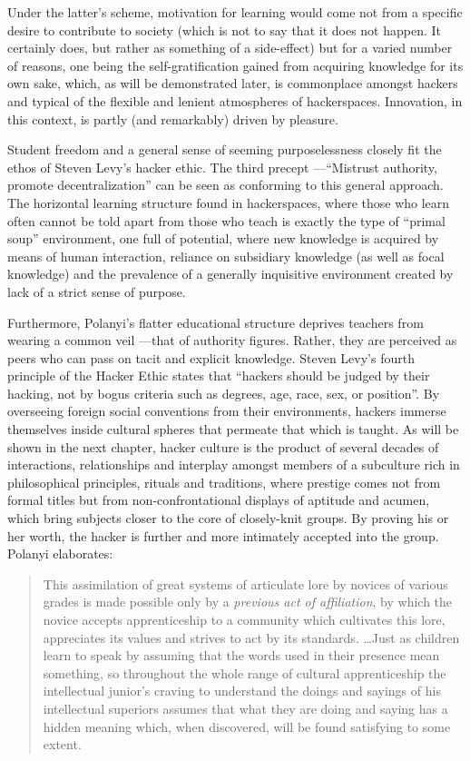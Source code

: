 Under the latter's scheme, motivation for learning would come not from a specific desire to contribute to society (which is not to say that it does not happen. It certainly does, but rather as something of a side-effect) but for a varied number of reasons, one being the self-gratification gained from acquiring knowledge for its own sake, which, as will be demonstrated later, is commonplace amongst hackers and typical of the flexible and lenient atmospheres of hackerspaces. Innovation, in this context, is partly (and remarkably) driven by pleasure. 

Student freedom and a general sense of seeming purposelessness closely fit the ethos of Steven Levy's hacker ethic. The third precept ---``Mistrust authority, promote decentralization'' can be seen as conforming to this general approach. The horizontal learning structure found in hackerspaces, where those who learn often cannot be told apart from those who teach is exactly the type of ``primal soup'' environment, one full of potential, where new knowledge is acquired by means of human interaction, reliance on subsidiary knowledge (as well as focal knowledge) and the prevalence of a generally inquisitive environment created by lack of a strict sense of purpose.



Furthermore, Polanyi's flatter educational structure deprives teachers from wearing a common veil ---that of authority figures. Rather, they are perceived as peers who can pass on tacit and explicit knowledge. Steven Levy's fourth principle of the Hacker Ethic states that ``hackers should be judged by their hacking, not by bogus criteria such as degrees, age, race, sex, or position''. By overseeing foreign social conventions from their environments, hackers immerse themselves inside cultural spheres that permeate that which is taught. As will be shown in the next chapter, hacker culture is the product of several decades of interactions, relationships and interplay amongst members of a subculture rich in philosophical principles, rituals and traditions, where prestige comes not from formal titles but from non-confrontational displays of aptitude and acumen, which bring subjects closer to the core of closely-knit groups. By proving his or her worth, the hacker is further and more intimately accepted into the group. Polanyi elaborates:

\begin{quote}
This assimilation of great systems of articulate lore by novices of various grades is made possible only by a \emph{previous act of affiliation}, by which the novice accepts apprenticeship to a community which cultivates this lore, appreciates its values and strives to act by its standards. \ldots Just as children learn to speak by assuming that the words used in their presence mean something, so throughout the whole range of cultural apprenticeship the intellectual junior's craving to understand the doings and sayings of his intellectual superiors assumes that what they are doing and saying has a hidden meaning which, when discovered, will be found satisfying to some extent. \citep[p.207]{polanyi58}
\end{quote}

